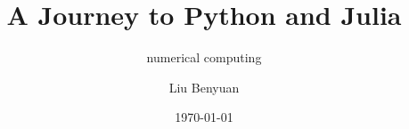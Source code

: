 \documentclass[a4paper,12pt,openany]{article}
\title{A Journey to Python and Julia}
\subtitle{numerical computing}
\author{Liu Benyuan}
\date{\today}
\begin{document}
\graphicspath{{fig/}}
\maketitle
\tableofcontents






%
%
\end{document}
